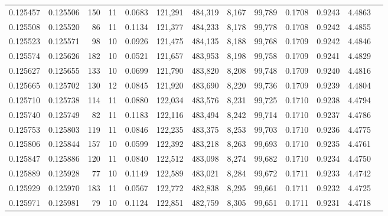 \begin{tabular}{rrrrrrrrrrrrr}
0.125457 & 0.125506 &   150 &  11 &                                     0.0683 & 121,291 & 484,319 &   8,167 &  99,789 & 0.1708 & 0.9243 & 4.4863 \\
0.125508 & 0.125520 &    86 &  11 &                                     0.1134 & 121,377 & 484,233 &   8,178 &  99,778 & 0.1708 & 0.9242 & 4.4855 \\
0.125523 & 0.125571 &    98 &  10 &                                     0.0926 & 121,475 & 484,135 &   8,188 &  99,768 & 0.1709 & 0.9242 & 4.4846 \\
0.125574 & 0.125626 &   182 &  10 &                                     0.0521 & 121,657 & 483,953 &   8,198 &  99,758 & 0.1709 & 0.9241 & 4.4829 \\
0.125627 & 0.125655 &   133 &  10 &                                     0.0699 & 121,790 & 483,820 &   8,208 &  99,748 & 0.1709 & 0.9240 & 4.4816 \\
0.125665 & 0.125702 &   130 &  12 &                                     0.0845 & 121,920 & 483,690 &   8,220 &  99,736 & 0.1709 & 0.9239 & 4.4804 \\
0.125710 & 0.125738 &   114 &  11 &                                     0.0880 & 122,034 & 483,576 &   8,231 &  99,725 & 0.1710 & 0.9238 & 4.4794 \\
0.125740 & 0.125749 &    82 &  11 &                                     0.1183 & 122,116 & 483,494 &   8,242 &  99,714 & 0.1710 & 0.9237 & 4.4786 \\
0.125753 & 0.125803 &   119 &  11 &                                     0.0846 & 122,235 & 483,375 &   8,253 &  99,703 & 0.1710 & 0.9236 & 4.4775 \\
0.125806 & 0.125844 &   157 &  10 &                                     0.0599 & 122,392 & 483,218 &   8,263 &  99,693 & 0.1710 & 0.9235 & 4.4761 \\
0.125847 & 0.125886 &   120 &  11 &                                     0.0840 & 122,512 & 483,098 &   8,274 &  99,682 & 0.1710 & 0.9234 & 4.4750 \\
0.125889 & 0.125928 &    77 &  10 &                                     0.1149 & 122,589 & 483,021 &   8,284 &  99,672 & 0.1711 & 0.9233 & 4.4742 \\
0.125929 & 0.125970 &   183 &  11 &                                     0.0567 & 122,772 & 482,838 &   8,295 &  99,661 & 0.1711 & 0.9232 & 4.4725 \\
0.125971 & 0.125981 &    79 &  10 &                                     0.1124 & 122,851 & 482,759 &   8,305 &  99,651 & 0.1711 & 0.9231 & 4.4718 \\

\end{tabular}
